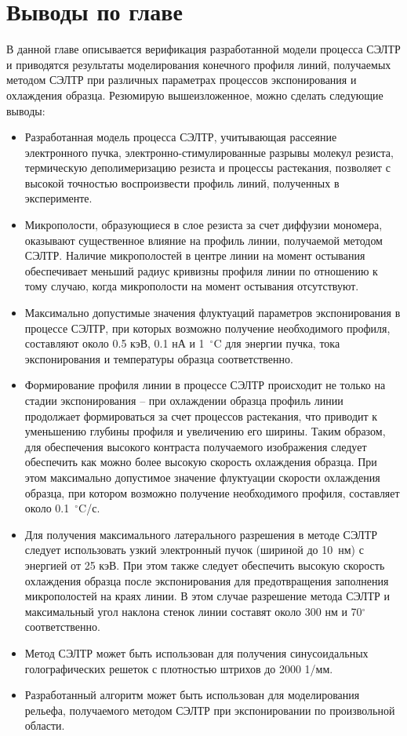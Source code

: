 \section{Выводы по главе}

В данной главе описывается верификация разработанной модели процесса СЭЛТР и приводятся результаты моделирования конечного профиля линий, получаемых методом СЭЛТР при различных параметрах процессов экспонирования и охлаждения образца. Резюмирую вышеизложенное, можно сделать следующие выводы:

\begin{itemize}
	\item Разработанная модель процесса СЭЛТР, учитывающая рассеяние электронного пучка, электронно-стимулированные разрывы молекул резиста, термическую деполимеризацию резиста и процессы растекания, позволяет с высокой точностью воспроизвести профиль линий, полученных в эксперименте.
	\item Микрополости, образующиеся в слое резиста за счет диффузии мономера, оказывают существенное влияние на профиль линии, получаемой методом СЭЛТР. Наличие микрополостей в центре линии на момент остывания обеспечивает меньший радиус кривизны профиля линии по отношению к тому случаю, когда микрополости на момент остывания отсутствуют.
	\item Максимально допустимые значения флуктуаций параметров экспонирования в процессе СЭЛТР, при которых возможно получение необходимого профиля, составляют около 0.5 кэВ, 0.1 нА и 1~$^\circ$C для энергии пучка, тока экспонирования и температуры образца соответственно.
	\item Формирование профиля линии в процессе СЭЛТР происходит не только на стадии экспонирования -- при охлаждении образца профиль линии продолжает формироваться за счет процессов растекания, что приводит к уменьшению глубины профиля и увеличению его ширины. Таким образом, для обеспечения высокого контраста получаемого изображения следует обеспечить как можно более высокую скорость охлаждения образца. При этом максимально допустимое значение флуктуации скорости охлаждения образца, при котором возможно получение необходимого профиля, составляет около 0.1~$^\circ$C/с.
	\item Для получения максимального латерального разрешения в методе СЭЛТР следует использовать узкий электронный пучок (шириной до 10~нм) с энергией от 25 кэВ. При этом также следует обеспечить высокую скорость охлаждения образца после экспонирования для предотвращения заполнения микрополостей на краях линии. В этом случае разрешение метода СЭЛТР и максимальный угол наклона стенок линии составят около 300 нм и 70$^\circ$ соответственно.
	\item Метод СЭЛТР может быть использован для получения синусоидальных голографических решеток с плотностью штрихов до 2000 1/мм.
	\item Разработанный алгоритм может быть использован для моделирования рельефа, получаемого методом СЭЛТР при экспонировании по произвольной области.
\end{itemize}
